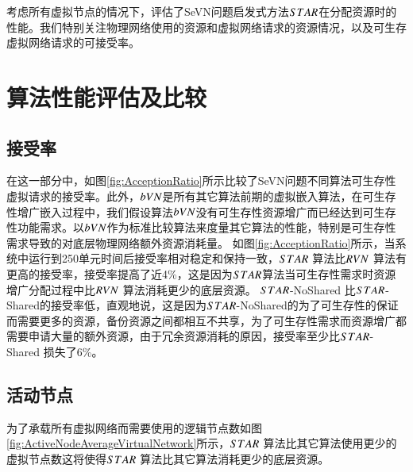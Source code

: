 考虑所有虚拟节点的情况下，评估了SeVN问题启发式方法$STAR$在分配资源时的性能。我们特别关注物理网络使用的资源和虚拟网络请求的资源情况，以及可生存虚拟网络请求的可接受率。
\section{算法性能评估及比较}
\subsection{接受率}
在这一部分中，如图\ref{fig:AcceptionRatio}所示比较了SeVN问题不同算法可生存性虚拟请求的接受率。此外，$bVN$是所有其它算法前期的虚拟嵌入算法，在可生存性增广嵌入过程中，我们假设算法$bVN$没有可生存性资源增广而已经达到可生存性功能需求。以$bVN$作为标准比较算法来度量其它算法的性能，特别是可生存性需求导致的对底层物理网络额外资源消耗量。
如图\ref{fig:AcceptionRatio}所示，当系统中运行到250单元时间后接受率相对稳定和保持一致，$STAR$ 算法比$RVN$ 算法有更高的接受率，接受率提高了近4\%，这是因为$STAR$算法当可生存性需求时资源增广分配过程中比$RVN$ 算法消耗更少的底层资源。 $STAR$-NoShared 比$STAR$-Shared的接受率低，直观地说，这是因为$STAR$-NoShared的为了可生存性的保证而需要更多的资源，备份资源之间都相互不共享，为了可生存性需求而资源增广都需要申请大量的额外资源，由于冗余资源消耗的原因，接受率至少比$STAR$-Shared 损失了6\%。

\subsection{活动节点}
为了承载所有虚拟网络而需要使用的逻辑节点数如图\ref{fig:ActiveNodeAverageVirtualNetwork}所示，$STAR$ 算法比其它算法使用更少的虚拟节点数这将使得$STAR$ 算法比其它算法消耗更少的底层资源。

